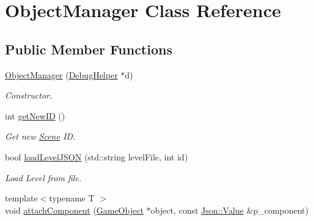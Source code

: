 \hypertarget{class_object_manager}{}\section{Object\+Manager Class Reference}
\label{class_object_manager}
\subsection*{Public Member Functions}
\begin{DoxyCompactItemize}
\item 
\mbox{\label{class_object_manager_afc985bd1e973ef44860b996180f3c657}} 
\mbox{\hyperlink{class_object_manager_afc985bd1e973ef44860b996180f3c657}{Object\+Manager}} (\mbox{\hyperlink{class_debug_helper}{Debug\+Helper}} $\ast$d)
\begin{DoxyCompactList}\small\item\em Constructor. \end{DoxyCompactList}\item 
\mbox{\label{class_object_manager_a550d7be8dd5e15d912c533dd3e4e31ab}} 
int \mbox{\hyperlink{class_object_manager_a550d7be8dd5e15d912c533dd3e4e31ab}{get\+New\+ID}} ()
\begin{DoxyCompactList}\small\item\em Get new \mbox{\hyperlink{class_scene}{Scene}} ID. \end{DoxyCompactList}\item 
\mbox{\label{class_object_manager_a845db4dd11b1a5d7d1817c53fd4ab9eb}} 
bool \mbox{\hyperlink{class_object_manager_a845db4dd11b1a5d7d1817c53fd4ab9eb}{load\+Level\+J\+S\+ON}} (std\+::string level\+File, int id)
\begin{DoxyCompactList}\small\item\em Load Level from file. \end{DoxyCompactList}\item 
\mbox{\label{class_object_manager_a1fb1d8ec2c389970395beb9d1329de50}} 
{\footnotesize template$<$typename T $>$ }\\void \mbox{\hyperlink{class_object_manager_a1fb1d8ec2c389970395beb9d1329de50}{attach\+Component}} (\mbox{\hyperlink{class_game_object}{Game\+Object}} $\ast$object, const \mbox{\hyperlink{class_json_1_1_value}{Json\+::\+Value}} \&p\+\_\+component)

\end{DoxyCompactItemize}
